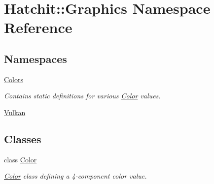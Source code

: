 \hypertarget{namespaceHatchit_1_1Graphics}{}\section{Hatchit\+:\+:Graphics Namespace Reference}
\label{namespaceHatchit_1_1Graphics}
\subsection*{Namespaces}
\begin{DoxyCompactItemize}
\item 
 \hyperlink{namespaceHatchit_1_1Graphics_1_1Colors}{Colors}
\begin{DoxyCompactList}\small\item\em Contains static definitions for various \hyperlink{classHatchit_1_1Graphics_1_1Color}{Color} values. \end{DoxyCompactList}\item 
 \hyperlink{namespaceHatchit_1_1Graphics_1_1Vulkan}{Vulkan}
\end{DoxyCompactItemize}
\subsection*{Classes}
\begin{DoxyCompactItemize}
\item 
class \hyperlink{classHatchit_1_1Graphics_1_1Color}{Color}
\begin{DoxyCompactList}\small\item\em \hyperlink{classHatchit_1_1Graphics_1_1Color}{Color} class defining a 4-\/component color value. \end{DoxyCompactList}\end{DoxyCompactItemize}
